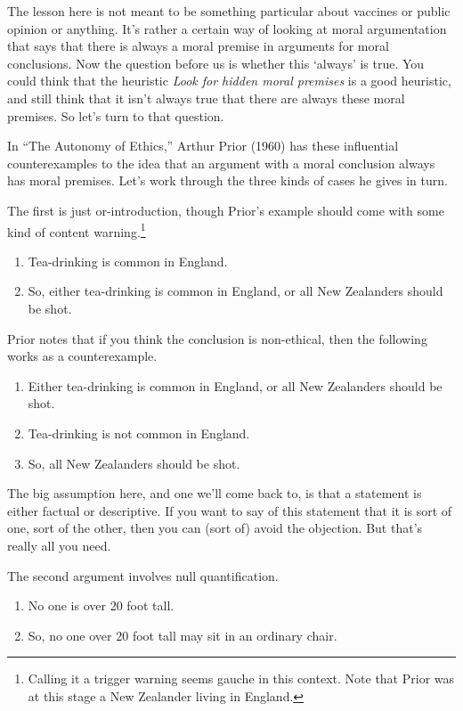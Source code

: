 \documentclass[
]{article}
\providecommand{\tightlist}{%
  \setlength{\itemsep}{0pt}\setlength{\parskip}{0pt}}
\begin{document}
The lesson here is not meant to be something particular about vaccines
or public opinion or anything. It's rather a certain way of looking at
moral argumentation that says that there is always a moral premise in
arguments for moral conclusions. Now the question before us is whether
this `always' is true. You could think that the heuristic \emph{Look for
hidden moral premises} is a good heuristic, and still think that it
isn't always true that there are always these moral premises. So let's
turn to that question.

In ``The Autonomy of Ethics,'' Arthur Prior (1960) has these influential
counterexamples to the idea that an argument with a moral conclusion
always has moral premises. Let's work through the three kinds of cases
he gives in turn.

The first is just or-introduction, though Prior's example should come
with some kind of content warning.\footnote{Calling it a trigger warning
  seems gauche in this context. Note that Prior was at this stage a New
  Zealander living in England.}

\begin{enumerate}
\def\labelenumi{\arabic{enumi}.}
\tightlist
\item
  Tea-drinking is common in England.
\item
  So, either tea-drinking is common in England, or all New Zealanders
  should be shot.
\end{enumerate}

Prior notes that if you think the conclusion is non-ethical, then the
following works as a counterexample.

\begin{enumerate}
\def\labelenumi{\arabic{enumi}.}
\tightlist
\item
  Either tea-drinking is common in England, or all New Zealanders should
  be shot.
\item
  Tea-drinking is not common in England.
\item
  So, all New Zealanders should be shot.
\end{enumerate}

The big assumption here, and one we'll come back to, is that a statement
is either factual or descriptive. If you want to say of this statement
that it is sort of one, sort of the other, then you can (sort of) avoid
the objection. But that's really all you need.

The second argument involves null quantification.

\begin{enumerate}
\def\labelenumi{\arabic{enumi}.}
\tightlist
\item
  No one is over 20 foot tall.
\item
  So, no one over 20 foot tall may sit in an ordinary chair.
\end{enumerate}
\end{document}
